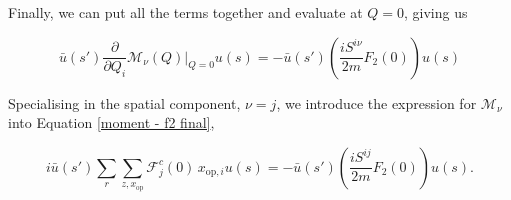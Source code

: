 \documentclass{article}
\numberwithin{equation}{section} %
\begin{document}
%
%
%


%
%

Finally, we can put all the terms together and evaluate at $Q=0$, giving us

\begin{equation}
\bar{u}(s')\frac{\partial}{\partial Q_i} \mathcal{M}_\nu(Q)\bigg\vert_{Q=0}u(s) = -\bar{u}(s')\left( \frac{iS^{i\nu}}{2m}F_2(0)\right)u(s)
\label{moment - f2 final}
\end{equation}

Specialising in the spatial component, $\nu=j$, we introduce the expression for $\mathcal{M}_\nu$ into Equation \ref{moment - f2 final},

\begin{equation}
i\bar{u}(s')\sum_r\sum_{z,x_\mathrm{op}} \mathcal{F}^c_j(0) \, x_{\mathrm{op},i}u(s) = -\bar{u}(s')\left( \frac{iS^{ij}}{2m}F_2(0)\right)u(s).
\label{feynman amplitude - f2}
\end{equation}
\end{document}
